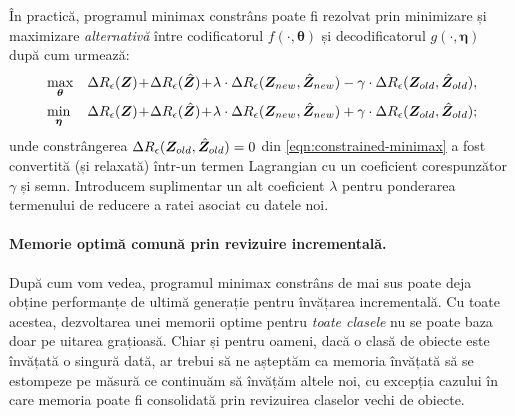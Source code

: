 \documentclass[../../book-main_ro.tex]{subfiles}
\begin{document}
În practică, programul minimax constrâns poate fi rezolvat prin minimizare și maximizare {\em alternativă} între codificatorul $f(\cdot, \bm \theta)$ și decodificatorul $g(\cdot, \bm \eta)$ după cum urmează:
\begin{eqnarray}
&\max_{\bm \theta}  &\Delta{R_\epsilon(\Z)}\!+\!\Delta{R_\epsilon(\hat{\Z})}\!+\!\lambda\cdot  \Delta{R_\epsilon(\Z_{new},\hat{\Z}_{new})} - \gamma\cdot \Delta{R_\epsilon(\Z_{old},\hat{\Z}_{old})}, \label{eqn:relaxed-max}\\
&\min_{\bm \eta} &\Delta{R_\epsilon(\Z)}\!+\!\Delta{R_\epsilon(\hat{\Z})}\!+\!\lambda\cdot \Delta{R_\epsilon(\Z_{new},\hat{\Z}_{new})} + \gamma\cdot \Delta{R_\epsilon(\Z_{old},\hat{\Z}_{old})}; \label{eqn:relaxed-min}
\end{eqnarray}
unde constrângerea $\Delta R_\epsilon(\bm{Z}_{old},\hat{\bm{Z}}_{old}) = 0$ din \eqref{eqn:constrained-minimax} a fost convertită (și relaxată) într-un termen Lagrangian cu un coeficient corespunzător $\gamma$ și semn. Introducem suplimentar un alt coeficient $\lambda$ pentru ponderarea termenului de reducere a ratei asociat cu datele noi.



\paragraph{Memorie optimă comună prin revizuire incrementală.}
După cum vom vedea, programul minimax constrâns de mai sus poate deja obține performanțe de ultimă generație pentru învățarea incrementală. Cu toate acestea, dezvoltarea unei memorii optime pentru {\em toate clasele} nu se poate baza doar pe uitarea grațioasă. Chiar și pentru oameni, dacă o clasă de obiecte este învățată o singură dată, ar trebui să ne așteptăm ca memoria învățată să se estompeze pe măsură ce continuăm să învățăm altele noi, cu excepția cazului în care memoria poate fi consolidată prin revizuirea claselor vechi de obiecte.
\end{document}
